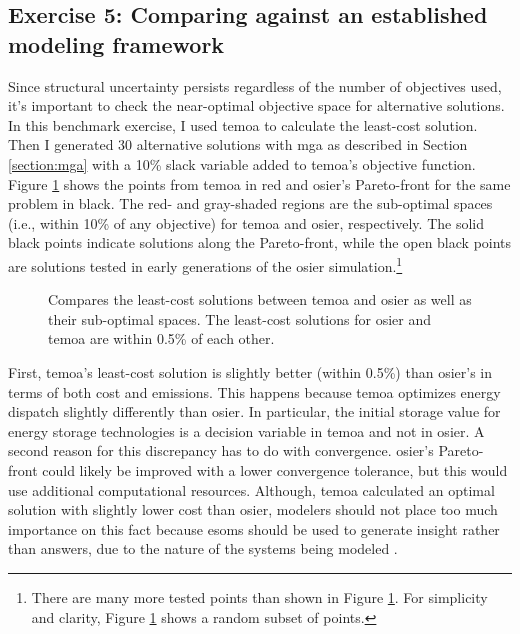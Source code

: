 \subsection{Exercise 5: Comparing against an established modeling framework}
Since structural uncertainty persists regardless of the number of objectives
used, it's important to check the near-optimal objective space for alternative
solutions. In this benchmark exercise, I used \ac{temoa} to calculate the
least-cost solution. Then I generated 30 alternative solutions with \ac{mga} as
described in Section \ref{section:mga} with a 10\% slack variable added to
\ac{temoa}'s objective function. Figure \ref{fig:temoa-benchmark-01} shows the
points from \ac{temoa} in red and \ac{osier}'s Pareto-front for the same problem
in black. The red- and gray-shaded regions are the sub-optimal spaces (i.e.,
within 10\% of any objective) for \ac{temoa} and \ac{osier}, respectively. The
solid black points indicate solutions along the Pareto-front, while the open black
points are solutions tested in early generations of the \ac{osier}
simulation.\footnote{There are many more tested points than shown in Figure
\ref{fig:temoa-benchmark-01}. For simplicity and clarity, Figure
\ref{fig:temoa-benchmark-01} shows a random subset of points.}

\begin{figure}[h]
  \centering
  \resizebox{0.75\columnwidth}{!}{}
  \caption{Compares the least-cost solutions between \acs{temoa}
  and \acs{osier} as well as their sub-optimal spaces. The least-cost solutions
  for \ac{osier} and \ac{temoa} are within 0.5\% of each other.}
  \label{fig:temoa-benchmark-01}
\end{figure}

First, \ac{temoa}'s least-cost solution is slightly better (within 0.5\%) than
\ac{osier}'s in terms of both cost and emissions. This happens because
\ac{temoa} optimizes energy dispatch slightly differently than \ac{osier}. In
particular, the initial storage value for energy storage technologies is a
decision variable in \ac{temoa} and not in \ac{osier}. A second reason for this
discrepancy has to do with convergence. \ac{osier}'s Pareto-front could likely
be improved with a lower convergence tolerance, but this would use additional
computational resources. Although, \ac{temoa} calculated an optimal solution
with slightly lower cost than \ac{osier}, modelers should not place too much
importance on this fact because \acp{esom} should be used to generate insight
rather than answers, due to the nature of the systems being modeled
\cite{decarolis_using_2011}.

